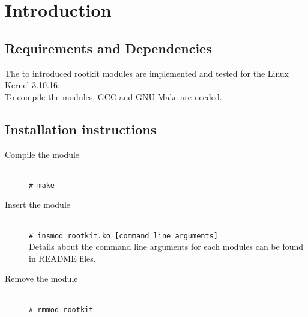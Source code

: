 \section{Introduction}
\subsection{Requirements and Dependencies}
The to introduced rootkit modules are implemented and tested for the Linux Kernel 3.10.16.\\
To compile the modules, GCC and GNU Make are needed.
\subsection{Installation instructions}
\begin{description}
	\item[Compile the module] \hfill\\
  \verb+# make+
  \item[Insert the module] \hfill\\
	\verb+# insmod rootkit.ko [command line arguments]+\\
{\small Details about the command line arguments for each modules can be found in README files.}
  \item[Remove the module] \hfill\\
  \verb+# rmmod rootkit+   
	\end{description}
